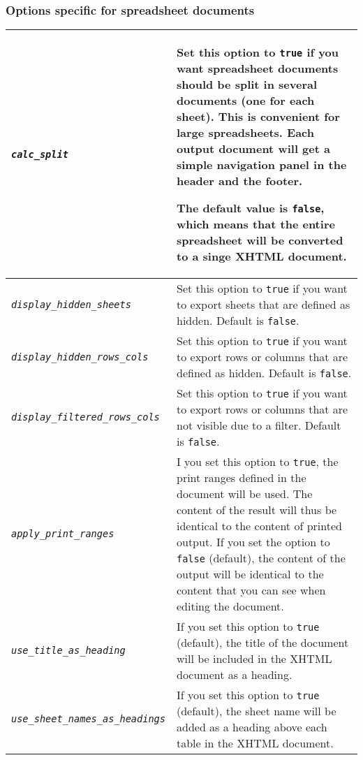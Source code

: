 \documentclass{article}
\newcommand\textstyleSourceText[1]{\texttt{\textmd{#1}}}
\begin{document}
\subsubsection{Options specific for spreadsheet documents}
\begin{center}
\begin{tabular}{|m{6.7850003cm}|m{9.828cm}|}

\hline
{\mdseries \textstyleSourceText{\emph{calc\_split}}} &
{\mdseries Set this option to \textstyleSourceText{true} if you want spreadsheet documents should be split in several documents (one for each sheet). This is convenient for large spreadsheets. Each output document will get a simple navigation panel in the header and the footer.}

{\mdseries The default value is \textstyleSourceText{false}, which means that the entire spreadsheet will be converted to a singe XHTML document.}\\\hline
{\mdseries \textstyleSourceText{\emph{display\_hidden\_sheets}}} &
{\mdseries Set this option to \textstyleSourceText{true} if you want to export sheets that are defined as hidden. Default is \textstyleSourceText{false}.}\\\hline
{\mdseries \textstyleSourceText{\emph{display\_hidden\_rows\_cols}}} &
{\mdseries Set this option to \textstyleSourceText{true} if you want to export rows or columns that are defined as hidden. Default is \textstyleSourceText{false}.}\\\hline
{\mdseries \textstyleSourceText{\emph{display\_filtered\_rows\_cols}}} &
{\mdseries Set this option to \textstyleSourceText{true} if you want to export rows or columns that are not visible due to a filter. Default is \textstyleSourceText{false}.}\\\hline
{\mdseries \textstyleSourceText{\emph{apply\_print\_ranges}}} &
{\mdseries I you set this option to \textstyleSourceText{true}, the print ranges defined in the document will be used. The content of the result will thus be identical to the content of printed output. If you set the option to \textstyleSourceText{false} (default), the content of the output will be identical to the content that you can see when editing the document.}\\\hline
{\mdseries \textstyleSourceText{\emph{use\_title\_as\_heading}}} &
{\mdseries If you set this option to \textstyleSourceText{true} (default), the title of the document will be included in the XHTML document as a heading.}\\\hline
{\mdseries \textstyleSourceText{\emph{use\_sheet\_names\_as\_headings}}} &
{\mdseries If you set this option to \textstyleSourceText{true} (default), the sheet name will be added as a heading above each table in the XHTML document.}\\\hline
\end{tabular}
\end{center}
\end{document}
